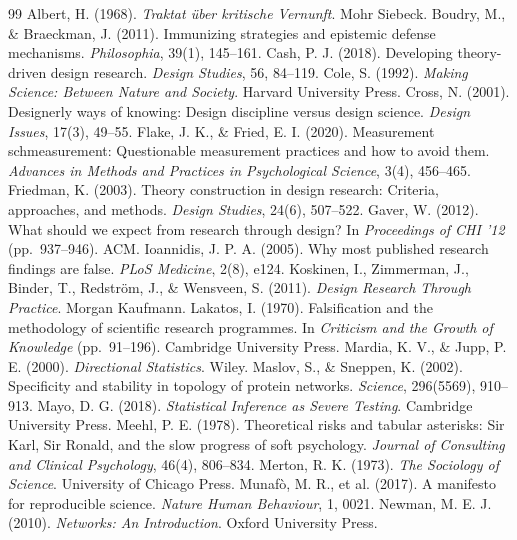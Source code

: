 \documentclass[11pt,a4paper]{article}
\begin{document}
\begin{thebibliography}{99}
 Albert, H. (1968). \emph{Traktat über kritische Vernunft}. Mohr Siebeck.
 Boudry, M., \& Braeckman, J. (2011). Immunizing strategies and epistemic defense mechanisms. \emph{Philosophia}, 39(1), 145--161.
 Cash, P. J. (2018). Developing theory-driven design research. \emph{Design Studies}, 56, 84--119.
 Cole, S. (1992). \emph{Making Science: Between Nature and Society}. Harvard University Press.
 Cross, N. (2001). Designerly ways of knowing: Design discipline versus design science. \emph{Design Issues}, 17(3), 49--55.
 Flake, J. K., \& Fried, E. I. (2020). Measurement schmeasurement: Questionable measurement practices and how to avoid them. \emph{Advances in Methods and Practices in Psychological Science}, 3(4), 456--465.
 Friedman, K. (2003). Theory construction in design research: Criteria, approaches, and methods. \emph{Design Studies}, 24(6), 507--522.
 Gaver, W. (2012). What should we expect from research through design? In \emph{Proceedings of CHI '12} (pp.\ 937--946). ACM.
 Ioannidis, J. P. A. (2005). Why most published research findings are false. \emph{PLoS Medicine}, 2(8), e124.
 Koskinen, I., Zimmerman, J., Binder, T., Redström, J., \& Wensveen, S. (2011). \emph{Design Research Through Practice}. Morgan Kaufmann.
 Lakatos, I. (1970). Falsification and the methodology of scientific research programmes. In \emph{Criticism and the Growth of Knowledge} (pp.\ 91--196). Cambridge University Press.
 Mardia, K. V., \& Jupp, P. E. (2000). \emph{Directional Statistics}. Wiley.
 Maslov, S., \& Sneppen, K. (2002). Specificity and stability in topology of protein networks. \emph{Science}, 296(5569), 910--913.
 Mayo, D. G. (2018). \emph{Statistical Inference as Severe Testing}. Cambridge University Press.
 Meehl, P. E. (1978). Theoretical risks and tabular asterisks: Sir Karl, Sir Ronald, and the slow progress of soft psychology. \emph{Journal of Consulting and Clinical Psychology}, 46(4), 806--834.
 Merton, R. K. (1973). \emph{The Sociology of Science}. University of Chicago Press.
 Munafò, M. R., et al. (2017). A manifesto for reproducible science. \emph{Nature Human Behaviour}, 1, 0021.
 Newman, M. E. J. (2010). \emph{Networks: An Introduction}. Oxford University Press.

\end{thebibliography}
\end{document}
